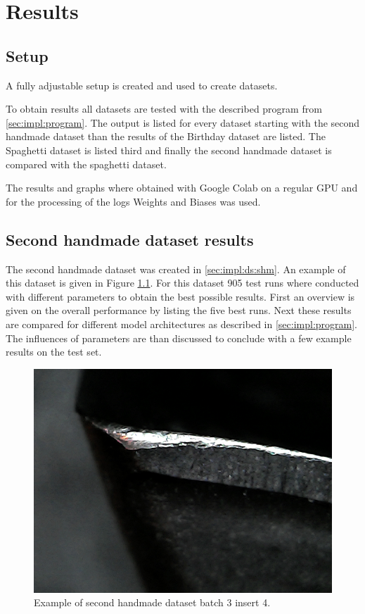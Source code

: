 \chapter{Results}

\section{Setup}
A fully adjustable setup is created and used to create datasets.

To obtain results all datasets are tested with the described program from \ref{sec:impl:program}. The output is listed for every dataset starting with the second handmade dataset than the results of the Birthday dataset are listed. The Spaghetti dataset is listed third and finally the second handmade dataset is compared with the spaghetti dataset.

The results and graphs where obtained with Google Colab on a regular GPU and for the processing of the logs Weights and Biases was used.
\section{Second handmade dataset results}
The second handmade dataset was created in \ref{sec:impl:ds:shm}. An example of this dataset is given in Figure \ref{fig:res:shm:example}. For this dataset 905 test runs where conducted with different parameters to obtain the best possible results. First an overview is given on the overall performance by listing the five best runs. Next these results are compared for different model architectures as described in \ref{sec:impl:program}. The influences of parameters are than discussed to conclude with a few example results on the test set.

\begin{figure}[hbtp]
\centering
\includegraphics[width=.3\textwidth]{fig/Vision/Dataset/handmade_datasets/Second_handmade_dataset/b_003_p_004_s.jpg}
\caption{Example of second handmade dataset batch 3 insert 4.}
\label{fig:res:shm:example}
\end{figure}

